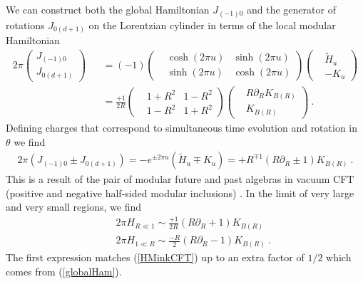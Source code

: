 \documentclass[a4paper,11pt]{article}
\theoremstyle{definition}
\newcommand{\nn}{\nonumber}
\newcommand{\lb}{\left(}
\newcommand{\rb}{\right)}
\newcommand{\p}{\partial}
\begin{document}
We can construct both the global Hamiltonian $J_{(-1)0}$ and the generator of rotations $J_{0(d+1)}$ on the Lorentzian cylinder in terms of the local modular Hamiltonian
       \begin{eqnarray}
    2\pi \begin{pmatrix}
    J_{(-1)0}\\
        J_{0(d+1)}
    \end{pmatrix}
    &&={(-1)}\begin{pmatrix}
        &\cosh(2\pi u) & \sinh(2\pi u)  \\
         &\sinh(2\pi u)& \cosh(2\pi u)
    \end{pmatrix}
    \begin{pmatrix}
        & \tilde{H}_u \\
        & -K_{u}
    \end{pmatrix}\nn\\
    &&=\frac{{+}1}{2R}\begin{pmatrix}
        &1+R^2 & 1-R^2  \\
         &1-R^2& 1+R^2
    \end{pmatrix}
    \begin{pmatrix}
        & R\p_R K_{B(R)}\\
        & K_{B(R)}
    \end{pmatrix}\ .
\end{eqnarray}
Defining charges that correspond to simultaneous time evolution and rotation in $\theta$ we find
\begin{eqnarray}
    2\pi(J_{(-1)0}\pm J_{0(d+1)})={-}e^{\pm 2\pi u}\lb\tilde{H}_u\mp K_u \rb={+}R^{\mp 1}\lb R\p_R\pm 1\rb K_{B(R)}\ .
\end{eqnarray}
This is a result of the pair of modular future and past algebras in vacuum CFT  (positive and negative half-sided modular inclusions) \cite{ouseph2024local}.
In the limit of very large and very small regions, we find
\begin{eqnarray}
    &&2\pi H_{R\ll 1}\sim \frac{{+}1}{2R}(R\p_R+1)K_{B(R)}\nn\\
    &&2\pi H_{1\ll R}\sim \frac{{-}R}{2}(R\p_R-1)K_{B(R)}\label{Minkwoski}\ .
\end{eqnarray}
The first expression matches (\ref{HMinkCFT}) up to an extra factor of $1/2$ which comes from (\ref{globalHam}). 


\end{document}
